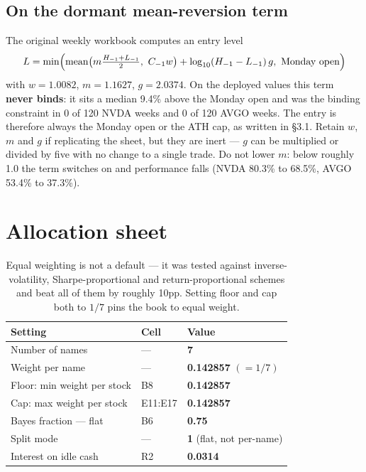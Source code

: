 \documentclass[11pt]{article}
\begin{document}
\subsection{On the dormant mean-reversion term}

The original weekly workbook computes an entry level
\[
L=\min\Bigl(\operatorname{mean}\bigl(m\tfrac{H_{-1}+L_{-1}}{2},\ C_{-1}w\bigr)
+\log_{10}(H_{-1}-L_{-1})\,g,\ \text{Monday open}\Bigr)
\]
with $w=1.0082$, $m=1.1627$, $g=2.0374$. On the deployed values this term \textbf{never binds}:
it sits a median 9.4\% above the Monday open and was the binding constraint in 0 of 120 NVDA
weeks and 0 of 120 AVGO weeks. The entry is therefore always the Monday open or the ATH cap, as
written in \S3.1. Retain $w$, $m$ and $g$ if replicating the sheet, but they are inert ---
$g$ can be multiplied or divided by five with no change to a single trade. Do not lower $m$:
below roughly 1.0 the term switches on and performance falls (NVDA 80.3\% to 68.5\%, AVGO 53.4\%
to 37.3\%).

\section{Allocation sheet}

\begin{table}[H]\centering\small
\begin{tabular}{lll}
\toprule
\textbf{Setting} & \textbf{Cell} & \textbf{Value}\\
\midrule
\rowcolor{bckeep} Number of names & --- & \textbf{7}\\
Weight per name & --- & \textbf{0.142857} $(=1/7)$\\
\rowcolor{bcact} Floor: min weight per stock & B8 & \textbf{0.142857}\\
Cap: max weight per stock & E11:E17 & \textbf{0.142857}\\
\rowcolor{bckeep} Bayes fraction --- flat & B6 & \textbf{0.75}\\
Split mode & --- & \textbf{1} (flat, not per-name)\\
\rowcolor{bckeep} Interest on idle cash & R2 & \textbf{0.0314}\\
\bottomrule
\end{tabular}
\caption{Equal weighting is not a default --- it was tested against inverse-volatility,
Sharpe-proportional and return-proportional schemes and beat all of them by roughly 10pp.
Setting floor and cap both to $1/7$ pins the book to equal weight.}
\end{table}
\end{document}
